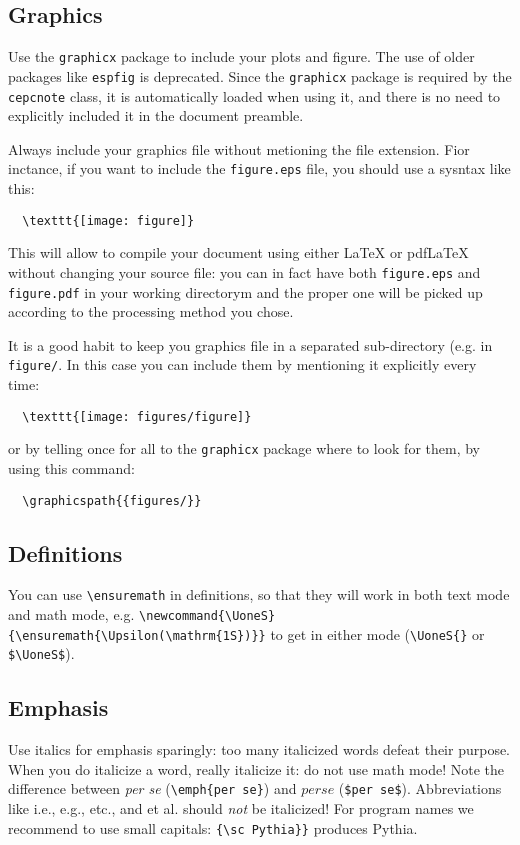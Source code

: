 \documentclass[11pt,a4paper]{cepcnote}
\begin{document}
\subsection{Graphics}

Use the {\tt graphicx} package \cite{} to include your plots and
figure. The use of older packages like {\tt espfig} is deprecated.
Since the {\tt graphicx} package is required by the {\tt cepcnote}
class, it is automatically loaded when using it, and there is no need
to explicitly included it in the document preamble.

Always include your graphics file without metioning the file
extension. Fior inctance, if you want to include the {\tt figure.eps}
file, you should use a sysntax like this:
\begin{verbatim}
  \texttt{[image: figure]}
\end{verbatim}
This will allow to compile your document using either \LaTeX{} or
pdf\LaTeX{} without changing your source file: you can in fact have
both {\tt figure.eps} and {\tt figure.pdf} in your working directorym
and the proper one will be picked up according to the processing method
you chose.

It is a good habit to keep you graphics file in a separated
sub-directory (e.g. in {\tt figure/}. In this case you can include them
by mentioning it explicitly every time:
\begin{verbatim}
  \texttt{[image: figures/figure]}
\end{verbatim}
or by telling once for all to the {\tt graphicx} package where to look
for them, by using this command:
\begin{verbatim}
  \graphicspath{{figures/}}
\end{verbatim}


\subsection{Definitions}

You can use \verb|\ensuremath| in definitions, so that they will work
in both text mode and math mode, e.g.
\verb|\newcommand{\UoneS}{\ensuremath{\Upsilon(\mathrm{1S})}}| to get
\UoneS{} in either mode (\verb|\UoneS{}| or \verb|$\UoneS$|).

\subsection{Emphasis}

Use italics for emphasis sparingly: too many italicized words defeat
their purpose. When you do italicize a word, really italicize it: do
not use math mode! Note the difference between \emph{per se}
(\verb|\emph{per se}|) and $per se$ (\verb+$per se$+). Abbreviations
like i.e., e.g., etc., and et al. should \emph{not} be italicized!
For program names we recommend to use small capitals:
\verb|{\sc Pythia}}| produces {\sc Pythia}.
\end{document}
